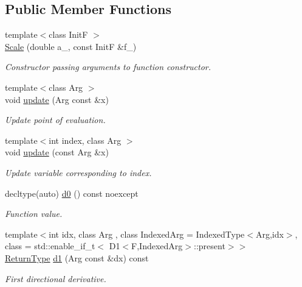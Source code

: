 \subsection*{Public Member Functions}
\begin{DoxyCompactItemize}
\item 
{\footnotesize template$<$class Init\+F $>$ }\\\hyperlink{structFunG_1_1MathematicalOperations_1_1Scale_ab86612b868aaee66786793da2ec7a54a}{Scale} (double a\+\_\+, const Init\+F \&f\+\_\+)
\begin{DoxyCompactList}\small\item\em Constructor passing arguments to function constructor. \end{DoxyCompactList}\item 
{\footnotesize template$<$class Arg $>$ }\\void \hyperlink{structFunG_1_1MathematicalOperations_1_1Scale_aecf868f7b64e89e67053a328642a8fd3}{update} (Arg const \&x)
\begin{DoxyCompactList}\small\item\em Update point of evaluation. \end{DoxyCompactList}\item 
{\footnotesize template$<$int index, class Arg $>$ }\\void \hyperlink{structFunG_1_1MathematicalOperations_1_1Scale_a49b277539bf6582956f68d325ce4a44d}{update} (const Arg \&x)
\begin{DoxyCompactList}\small\item\em Update variable corresponding to index. \end{DoxyCompactList}\item 
decltype(auto) \hyperlink{structFunG_1_1MathematicalOperations_1_1Scale_aec01731655fabb0f6fcfd06493aec4af}{d0} () const noexcept
\begin{DoxyCompactList}\small\item\em Function value. \end{DoxyCompactList}\item 
{\footnotesize template$<$int idx, class Arg , class Indexed\+Arg  = Indexed\+Type$<$\+Arg,idx$>$, class  = std\+::enable\+\_\+if\+\_\+t$<$ D1$<$\+F,\+Indexed\+Arg$>$\+::present$>$$>$ }\\\hyperlink{structFunG_1_1MathematicalOperations_1_1Scale_ab523d0773ef3380dcdf035cc19b01b5f}{Return\+Type} \hyperlink{structFunG_1_1MathematicalOperations_1_1Scale_adb6db8654d08b056e75d3355c41a2a2b}{d1} (Arg const \&dx) const 
\begin{DoxyCompactList}\small\item\em First directional derivative. \end{DoxyCompactList}\item 

\end{DoxyCompactItemize}
